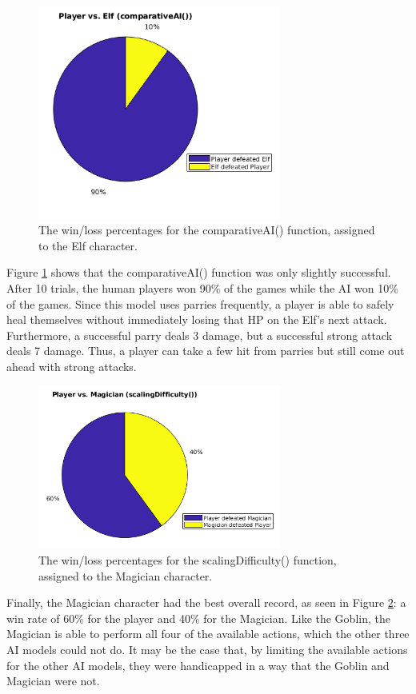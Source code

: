 \begin{figure}[H]
  \centering
  \includegraphics[width=8cm]{figures/elfWins.png}
  \caption{The win/loss percentages for the comparativeAI() function, assigned to the Elf character.}
  \label{fig:pieElf}
\end{figure}

Figure \ref{fig:pieElf} shows that the comparativeAI() function was only slightly successful. After 10 trials, the human players won 90\% of the games while the AI won 10\% of the games. Since this model uses parries frequently, a player is able to safely heal themselves without immediately losing that HP on the Elf's next attack. Furthermore, a successful parry deals 3 damage, but a successful strong attack deals 7 damage. Thus, a player can take a few hit from parries but still come out ahead with strong attacks.

\begin{figure}[H]
  \centering
  \includegraphics[width=8cm]{figures/magicianWins.png}
  \caption{The win/loss percentages for the scalingDifficulty() function, assigned to the Magician character.}
  \label{fig:pieMagician}
\end{figure}

Finally, the Magician character had the best overall record, as seen in Figure \ref{fig:pieMagician}: a win rate of 60\% for the player and 40\% for the Magician. Like the Goblin, the Magician is able to perform all four of the available actions, which the other three AI models could not do. It may be the case that, by limiting the available actions for the other AI models, they were handicapped in a way that the Goblin and Magician were not.\\

